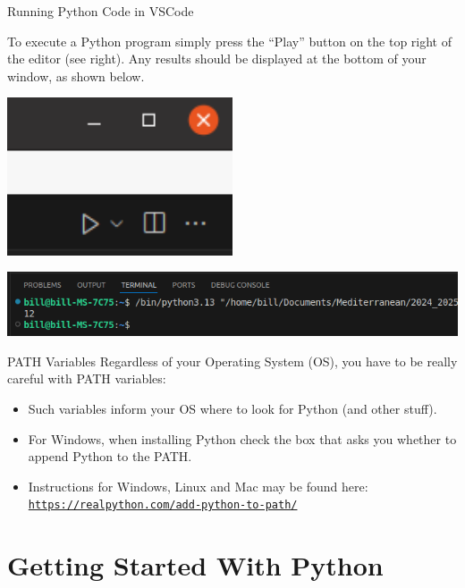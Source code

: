 \documentclass[aspectratio=169, 12pt, xcolor=table]{beamer}
\newcommand{\ohref}[1]{\href{#1}{\texttt{#1}}}
\begin{document}
	\begin{frame}{Running Python Code in VSCode}
		\begin{minipage}[t]{0.65\textwidth}
			\vspace{0pt}
			\raggedright
			To execute a Python program simply press the ``Play'' button on the top right of the editor (see right). Any results should be displayed at the bottom of your window, as shown below.
		\end{minipage}\hfill
		\begin{minipage}[t]{0.33\textwidth}
			\vspace{0pt}
			\centering
			\includegraphics[width=0.5\textwidth]{./assets/vsc_run.png}
		\end{minipage}\vfill
		\begin{minipage}{\textwidth}
			\includegraphics[width=\textwidth]{./assets/vsc_output.png}
		\end{minipage}
	\end{frame}

	\begin{headsup}{PATH Variables}
		Regardless of your Operating System (OS), you have to be really careful with PATH variables:
		\begin{itemize}
			\item Such variables inform your OS where to look for Python (and other stuff).
			\item For Windows, when installing Python check the box that asks you whether to append Python to the PATH.
			\item Instructions for Windows, Linux and Mac may be found here: \ohref{https://realpython.com/add-python-to-path/}
		\end{itemize}
	\end{headsup}

	\section{Getting Started With Python}\label{sec:getting-started-with-python}
	
\end{document}
